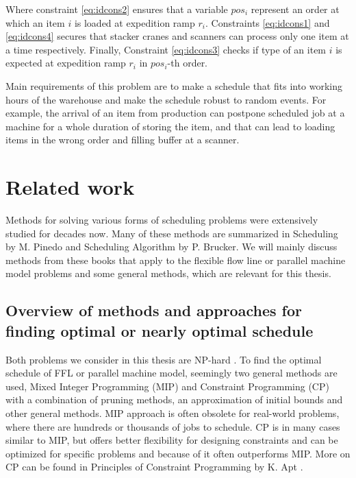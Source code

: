 \documentclass{ctuthesis}
\begin{document}
Where constraint \ref{eq:idcons2} ensures that a variable $pos_i$ represent an order at which an item $i$ is loaded at expedition ramp $r_i$. Constraints \ref{eq:idcons1} and \ref{eq:idcons4} secures that stacker cranes and scanners can process only one item at a time respectively. Finally, Constraint \ref{eq:idcons3} checks if type of an item $i$ is expected at expedition ramp $r_i$ in $pos_i$-th order.

Main requirements of this problem are to make a schedule that fits into working hours of the warehouse and make the schedule robust to random events. For example, the arrival of an item from production can postpone scheduled job at a machine for a whole duration of storing the item, and that can lead to loading items in the wrong order and filling buffer at a scanner. 



\chapter{Related work}
\label{chap:Related work}
Methods for solving various forms of scheduling problems were extensively studied for decades now. Many of these methods are summarized in Scheduling by M. Pinedo \cite{pinedo} and Scheduling Algorithm by P. Brucker\cite{bucker}. We will mainly discuss methods from these books that apply to the flexible flow line or parallel machine model problems and some general methods, which are relevant for this thesis. 

\section{Overview of methods and approaches for finding optimal or nearly optimal schedule}

Both problems we consider in this thesis are NP-hard \cite{pinedo}. To find the optimal schedule of FFL or parallel machine model, seemingly two general methods are used, Mixed Integer Programming (MIP) and Constraint Programming (CP) with a combination of pruning methods, an approximation of initial bounds and other general methods. MIP approach is often obsolete for real-world problems, where there are hundreds or thousands of jobs to schedule. CP is in many cases similar to MIP, but offers better flexibility for designing constraints and can be optimized for specific problems and because of it often outperforms MIP. More on CP can be found in Principles of Constraint Programming by K. Apt \cite{cp}.
\end{document}
